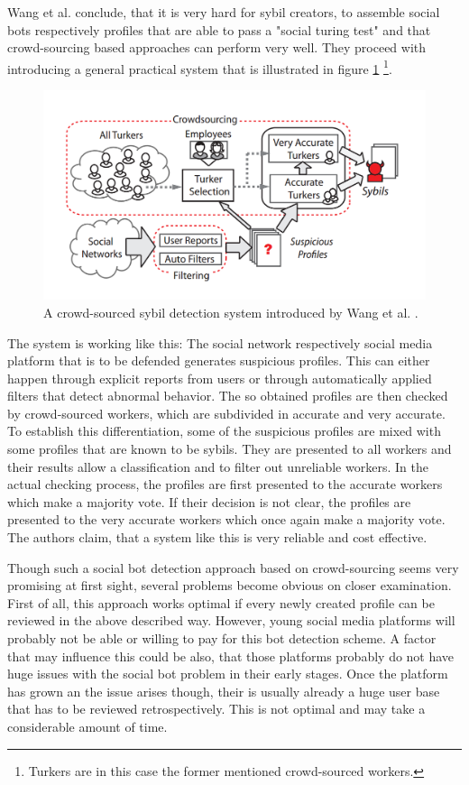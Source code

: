 Wang et al. conclude, that it is very hard for sybil creators, to assemble social bots respectively profiles that are able to pass a "social turing test" and that crowd-sourcing based approaches can perform very well. They proceed with introducing a general practical system that is illustrated in figure \ref{crowdsys} \footnote{Turkers are in this case the former mentioned crowd-sourced workers.}.

\begin{figure}
	\centering
	\includegraphics[scale=0.4]{fig/crowdsys}
	\caption{A crowd-sourced sybil detection system introduced by Wang et al. \cite{wangcrowd}.}
	\label{crowdsys}
\end{figure}

The system is working like this: The social network respectively social media platform that is to be defended generates suspicious profiles. This can either happen through explicit reports from users or through automatically applied filters that detect abnormal behavior. The so obtained profiles are then checked by crowd-sourced workers, which are subdivided in accurate and very accurate. To establish this differentiation, some of the suspicious profiles are mixed with some profiles that are known to be sybils. They are presented to all workers and their results allow a classification and to filter out unreliable workers. In the actual checking process, the profiles are first presented to the accurate workers which make a majority vote. If their decision is not clear, the profiles are presented to the very accurate workers which once again make a majority vote. 
The authors claim, that a system like this is very reliable and cost effective. 

Though such a social bot detection approach based on crowd-sourcing seems very promising at first sight, several problems become obvious on closer examination. First of all, this approach works optimal if every newly created profile can be reviewed in the above described way. However, young social media platforms will probably not be able or willing to pay for this bot detection scheme. A factor that may influence this could be also, that those platforms probably do not have huge issues with the social bot problem in their early stages. Once the platform has grown an the issue arises though, their is usually already a huge user base that has to be reviewed retrospectively. This is not optimal and may take a considerable amount of time.

